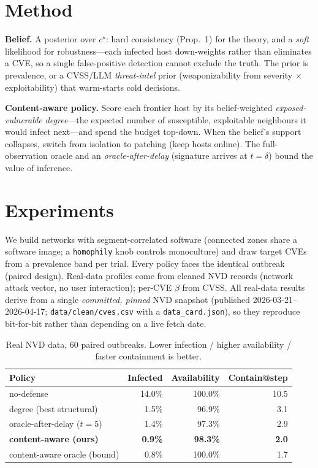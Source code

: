 \documentclass[11pt]{article}
\begin{document}
\section{Method}\label{sec:method}
\textbf{Belief.} A posterior over $c^\star$: hard consistency (Prop.~1) for the
theory, and a \emph{soft} likelihood for robustness---each infected host
down-weights rather than eliminates a CVE, so a single false-positive detection
cannot exclude the truth. The prior is prevalence, or a CVSS/LLM
\emph{threat-intel} prior (weaponizability from severity $\times$ exploitability)
that warm-starts cold decisions.

\textbf{Content-aware policy.} Score each frontier host by its belief-weighted
\emph{exposed-vulnerable degree}---the expected number of susceptible,
exploitable neighbours it would infect next---and spend the budget top-down. When
the belief's support collapses, switch from isolation to patching (keep hosts
online). The full-observation oracle and an \emph{oracle-after-delay} (signature
arrives at $t=\delta$) bound the value of inference.

\section{Experiments}\label{sec:exp}
We build networks with segment-correlated software (connected zones share a
software image; a \texttt{homophily} knob controls monoculture) and draw target
CVEs from a prevalence band per trial. Every policy faces the identical outbreak
(paired design). Real-data profiles come from cleaned NVD records (network attack
vector, no user interaction); per-CVE $\beta$ from CVSS. All real-data results
derive from a single \emph{committed, pinned} NVD snapshot (published
2026-03-21--2026-04-17; \texttt{data/clean/cves.csv} with a \texttt{data\_card.json}),
so they reproduce bit-for-bit rather than depending on a live fetch date.

\begin{table}[t]\centering
\caption{Real NVD data, 60 paired outbreaks. Lower infection / higher
availability / faster containment is better.}
\begin{tabular}{lrrr}
\toprule
Policy & Infected & Availability & Contain@step \\
\midrule
no-defense & 14.0\% & 100.0\% & 10.5 \\
degree (best structural) & 1.5\% & 96.9\% & 3.1 \\
oracle-after-delay ($t{=}5$) & 1.4\% & 97.3\% & 2.9 \\
\textbf{content-aware (ours)} & \textbf{0.9\%} & \textbf{98.3\%} & \textbf{2.0} \\
content-aware oracle (bound) & 0.8\% & 100.0\% & 1.7 \\
\bottomrule
\end{tabular}
\end{table}
\end{document}
